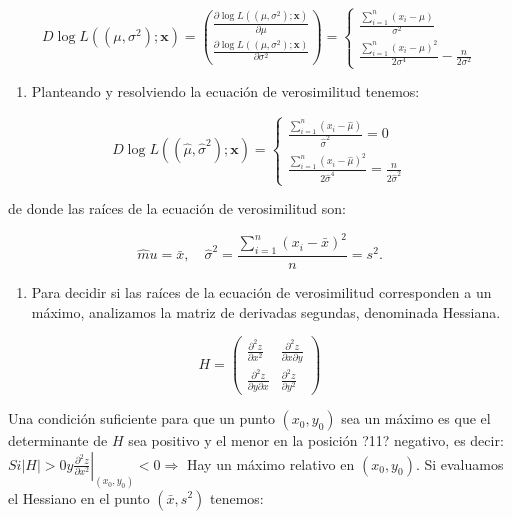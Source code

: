 \documentclass[
]{article}
\providecommand{\tightlist}{%
  \setlength{\itemsep}{0pt}\setlength{\parskip}{0pt}}
\begin{document}
\[
D \log L\left(\left(\mu, \sigma^{2}\right) ; \mathbf{x}\right)=\binom{\frac{\partial \log L\left(\left(\mu, \sigma^{2}\right) ; \mathbf{x}\right)}{\partial \mu}}{\frac{\partial \log L\left(\left(\mu, \sigma^{2}\right) ; \mathbf{x}\right)}{\partial \sigma^{2}}}=\left\{\begin{array}{c}
\frac{\sum_{i=1}^{n}\left(x_{i}-\mu\right)}{\sigma^{2}} \\
\frac{\sum_{i=1}^{n}\left(x_{i}-\mu\right)^{2}}{2 \sigma^{4}}-\frac{n}{2 \sigma^{2}}
\end{array}\right.
\]

\begin{enumerate}
\def\labelenumi{\arabic{enumi}.}
\setcounter{enumi}{3}
\tightlist
\item
  Planteando y resolviendo la ecuación de verosimilitud tenemos:
\end{enumerate}

\[
D \log L\left(\left(\hat{\mu}, \hat{\sigma}^{2}\right) ; \mathbf{x}\right)=\left\{\begin{array}{c}
\frac{\sum_{i=1}^{n}\left(x_{i}-\hat{\mu}\right)}{\hat{\sigma}^{2}}=0 \\
\frac{\sum_{i=1}^{n}\left(x_{i}-\hat{\mu}\right)^{2}}{2 \hat{\sigma}^{4}}=\frac{n}{2 \hat{\sigma}^{2}}
\end{array}\right.
\]

de donde las raíces de la ecuación de verosimilitud son:

\[
\hat{m} u=\bar{x}, \quad \hat{\sigma}^{2}=\frac{\sum_{i=1}^{n}\left(x_{i}-\bar{x}\right)^{2}}{n}=s^{2} .
\]

\begin{enumerate}
\def\labelenumi{\arabic{enumi}.}
\setcounter{enumi}{4}
\tightlist
\item
  Para decidir si las raíces de la ecuación de verosimilitud corresponden a un máximo, analizamos la matriz de derivadas segundas, denominada Hessiana.
\end{enumerate}

\[
H=\left(\begin{array}{cc}
\frac{\partial^{2} z}{\partial x^{2}} & \frac{\partial^{2} z}{\partial x \partial y} \\
\frac{\partial^{2} z}{\partial y \partial x} & \frac{\partial^{2} z}{\partial y^{2}}
\end{array}\right)
\]

Una condición suficiente para que un punto \(\left(x_{0}, y_{0}\right)\) sea un máximo es que el determinante de \(H\) sea positivo y el menor en la posición ?11? negativo, es decir:
\(S i|H|>\left.0 y \frac{\partial^{2} z}{\partial x^{2}}\right|_{\left(x_{0}, y_{0}\right)}<0 \Longrightarrow\) Hay un máximo relativo en \(\left(x_{0}, y_{0}\right)\).
Si evaluamos el Hessiano en el punto \(\left(\bar{x}, s^{2}\right)\) tenemos:
\end{document}
